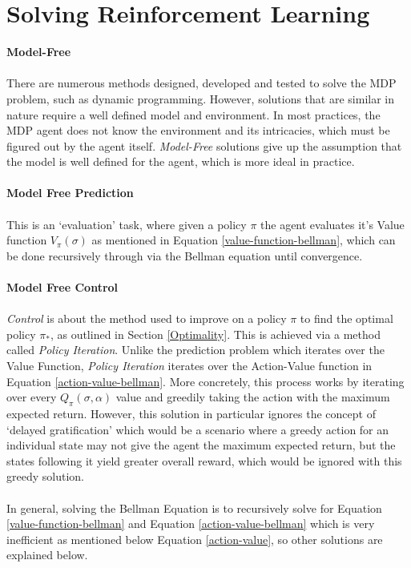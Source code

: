 \documentclass[ %
                    author={Ashwinder Khurana},
                supervisor={Prof Dave Cliff},
                    degree={MEng},
                     title={The Deeply Reinforced Trader},
                  subtitle={},
                      type={enterprise},
                      year={2020} ]{dissertation}
\begin{document}
{\section{Solving Reinforcement Learning}
\label{section:Solving Reinforcment Learning}
\textbf{Model-Free}
\\
\\
There are numerous methods designed, developed and tested to solve the MDP problem, such as dynamic programming. However, solutions that are similar in nature require a well defined model and environment. In most practices, the MDP agent does not know the environment and its intricacies, which must be figured out by the agent itself. \textit{Model-Free} solutions give up the assumption that the model is well defined for the agent, which is more ideal in practice.
\\
\\
\textbf{Model Free Prediction} 
\\
\\
This is an \enquote*{evaluation} task, where given a policy $\pi$ the agent evaluates it's Value function $V_\pi(\sigma)$ as mentioned in Equation \ref{value-function-bellman}, which can be done recursively through via the Bellman equation until convergence. 
\\
\\
\textbf{Model Free Control}
\\
\\
\noindent
\textit{Control} is about the method used to improve on a policy $\pi$ to find the optimal policy $\pi_*$, as outlined in Section \ref{Optimality}. This is achieved via a method called \textit{Policy Iteration}. Unlike the prediction problem which iterates over the Value Function, \textit{Policy Iteration} iterates over the Action-Value function in Equation \ref{action-value-bellman}. More concretely, this process works by iterating over every $Q_\pi(\sigma, \alpha)$ value and greedily taking the action with the maximum expected return. However, this solution in particular ignores the concept of \enquote*{delayed gratification} which would be a scenario where a greedy action for an individual state may not give the agent the maximum expected return, but the states following it yield greater overall reward, which would be ignored with this greedy solution. 
\\
\\
\noindent
In general, solving the Bellman Equation is to recursively solve for Equation \ref{value-function-bellman} and Equation \ref{action-value-bellman} which is very inefficient as mentioned below Equation \ref{action-value}, so other solutions are explained below. 

}
\end{document}
